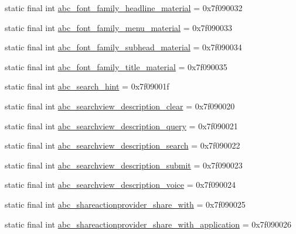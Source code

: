 \begin{CompactItemize}
\item 
static final int \hyperlink{classandroid_1_1support_1_1graphics_1_1drawable_1_1_r_1_1string_fec0b11c5e680c8bf6df351dcf399c85}{abc\_\-font\_\-family\_\-headline\_\-material} = 0x7f090032
\item 
static final int \hyperlink{classandroid_1_1support_1_1graphics_1_1drawable_1_1_r_1_1string_f77bc1684dfa1afc223b2c7e6ef08f95}{abc\_\-font\_\-family\_\-menu\_\-material} = 0x7f090033
\item 
static final int \hyperlink{classandroid_1_1support_1_1graphics_1_1drawable_1_1_r_1_1string_1b829e024eb8f0570e645895e6bd2f45}{abc\_\-font\_\-family\_\-subhead\_\-material} = 0x7f090034
\item 
static final int \hyperlink{classandroid_1_1support_1_1graphics_1_1drawable_1_1_r_1_1string_d55903b3555d7fcecaf7fb17d1482c39}{abc\_\-font\_\-family\_\-title\_\-material} = 0x7f090035
\item 
static final int \hyperlink{classandroid_1_1support_1_1graphics_1_1drawable_1_1_r_1_1string_f2a0ee739b81e08015001308d68923f6}{abc\_\-search\_\-hint} = 0x7f09001f
\item 
static final int \hyperlink{classandroid_1_1support_1_1graphics_1_1drawable_1_1_r_1_1string_5c084aed5d1a214f3e605ace6d8e76af}{abc\_\-searchview\_\-description\_\-clear} = 0x7f090020
\item 
static final int \hyperlink{classandroid_1_1support_1_1graphics_1_1drawable_1_1_r_1_1string_2a9a6c73d311e0bd423d2c5cf24b436b}{abc\_\-searchview\_\-description\_\-query} = 0x7f090021
\item 
static final int \hyperlink{classandroid_1_1support_1_1graphics_1_1drawable_1_1_r_1_1string_ed96e5787b3a49278d914a1022efcaa2}{abc\_\-searchview\_\-description\_\-search} = 0x7f090022
\item 
static final int \hyperlink{classandroid_1_1support_1_1graphics_1_1drawable_1_1_r_1_1string_171506eed11d15e424f060afaa2b27f2}{abc\_\-searchview\_\-description\_\-submit} = 0x7f090023
\item 
static final int \hyperlink{classandroid_1_1support_1_1graphics_1_1drawable_1_1_r_1_1string_4e219828f5ba673b376965881920be56}{abc\_\-searchview\_\-description\_\-voice} = 0x7f090024
\item 
static final int \hyperlink{classandroid_1_1support_1_1graphics_1_1drawable_1_1_r_1_1string_0b2268d212513677c4f03646c6b45956}{abc\_\-shareactionprovider\_\-share\_\-with} = 0x7f090025
\item 
static final int \hyperlink{classandroid_1_1support_1_1graphics_1_1drawable_1_1_r_1_1string_e141d80c13549db73d51d93643e266db}{abc\_\-shareactionprovider\_\-share\_\-with\_\-application} = 0x7f090026

\end{CompactItemize}
